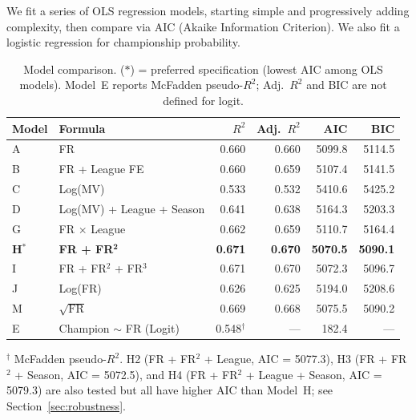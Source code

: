 \documentclass[11pt, a4paper]{article}
\begin{document}
We fit a series of OLS regression models, starting simple and progressively
adding complexity, then compare via AIC (Akaike Information Criterion). We also
fit a logistic regression for championship probability.

\begin{table}[H]
  \centering
  \small
  \caption{Model comparison. ($*$) = preferred specification (lowest AIC among OLS models). Model~E reports McFadden pseudo-$R^2$; Adj.~$R^2$ and BIC are not defined for logit.}
  \label{tab:modelcomp}
  \begin{tabular}{l p{5.5cm} r r r r}
    \toprule
    \rowcolor{NavyBlue}
    \color{white}\textbf{Model} &
    \color{white}\textbf{Formula} &
    \color{white}\textbf{$R^{2}$} &
    \color{white}\textbf{Adj.~$R^{2}$} &
    \color{white}\textbf{AIC} &
    \color{white}\textbf{BIC} \\
    \midrule
    A  & FR                               & 0.660 & 0.660 & 5099.8 & 5114.5 \\
    \rowcolor{RowA}
    B  & FR + League FE                   & 0.660 & 0.659 & 5107.4 & 5141.5 \\
    C  & Log(MV)                          & 0.533 & 0.532 & 5410.6 & 5425.2 \\
    \rowcolor{RowA}
    D  & Log(MV) + League + Season        & 0.641 & 0.638 & 5164.3 & 5203.3 \\
    G  & FR $\times$ League               & 0.662 & 0.659 & 5110.7 & 5164.4 \\
    \rowcolor{RowB}
    \textbf{H}$^*$ & \textbf{FR + FR}$^{\mathbf{2}}$
      & \textbf{0.671} & \textbf{0.670} & \textbf{5070.5} & \textbf{5090.1} \\
    \rowcolor{RowA}
    I  & FR + FR$^{2}$ + FR$^{3}$        & 0.671 & 0.670 & 5072.3 & 5096.7 \\
    J  & Log(FR)                          & 0.626 & 0.625 & 5194.0 & 5208.6 \\
    M  & $\sqrt{\text{FR}}$               & 0.669 & 0.668 & 5075.5 & 5090.2 \\
    \midrule
    E  & Champion $\sim$ FR (Logit)       & 0.548$^{\dagger}$ & --- & 182.4 & --- \\
    \bottomrule
  \end{tabular}
  \medskip

  \noindent\small $^{\dagger}$ McFadden pseudo-$R^{2}$.
  H2 (FR + FR$^2$ + League, AIC = 5077.3), H3 (FR + FR$^2$ + Season, AIC = 5072.5),
  and H4 (FR + FR$^2$ + League + Season, AIC = 5079.3) are also tested but all have
  higher AIC than Model~H; see Section~\ref{sec:robustness}.
\end{table}
\end{document}
